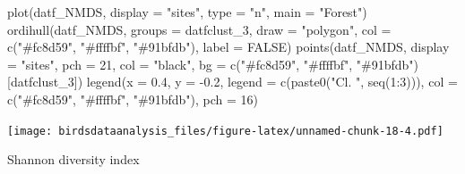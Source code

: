\documentclass[
]{article}
\newenvironment{Shaded}{\begin{snugshade}}{\end{snugshade}}
\newcommand{\AttributeTok}[1]{\textcolor[rgb]{0.77,0.63,0.00}{#1}}
\newcommand{\ConstantTok}[1]{\textcolor[rgb]{0.00,0.00,0.00}{#1}}
\newcommand{\DecValTok}[1]{\textcolor[rgb]{0.00,0.00,0.81}{#1}}
\newcommand{\FloatTok}[1]{\textcolor[rgb]{0.00,0.00,0.81}{#1}}
\newcommand{\FunctionTok}[1]{\textcolor[rgb]{0.00,0.00,0.00}{#1}}
\newcommand{\NormalTok}[1]{#1}
\newcommand{\SpecialCharTok}[1]{\textcolor[rgb]{0.00,0.00,0.00}{#1}}
\newcommand{\StringTok}[1]{\textcolor[rgb]{0.31,0.60,0.02}{#1}}
\begin{document}
\begin{Shaded}
\begin{Highlighting}[]
\FunctionTok{plot}\NormalTok{(datf\_NMDS, }\AttributeTok{display =} \StringTok{"sites"}\NormalTok{, }\AttributeTok{type =} \StringTok{"n"}\NormalTok{, }\AttributeTok{main =} \StringTok{"Forest"}\NormalTok{)}
\FunctionTok{ordihull}\NormalTok{(datf\_NMDS, }\AttributeTok{groups =}\NormalTok{ datfclust\_3,}
         \AttributeTok{draw =} \StringTok{"polygon"}\NormalTok{, }\AttributeTok{col =} \FunctionTok{c}\NormalTok{(}\StringTok{"\#fc8d59"}\NormalTok{, }\StringTok{"\#ffffbf"}\NormalTok{, }\StringTok{"\#91bfdb"}\NormalTok{),}
         \AttributeTok{label =} \ConstantTok{FALSE}\NormalTok{)}
\FunctionTok{points}\NormalTok{(datf\_NMDS, }\AttributeTok{display =} \StringTok{"sites"}\NormalTok{, }\AttributeTok{pch =} \DecValTok{21}\NormalTok{, }\AttributeTok{col =} \StringTok{"black"}\NormalTok{,}
       \AttributeTok{bg =} \FunctionTok{c}\NormalTok{(}\StringTok{"\#fc8d59"}\NormalTok{, }\StringTok{"\#ffffbf"}\NormalTok{, }\StringTok{"\#91bfdb"}\NormalTok{)[datfclust\_3])}
\FunctionTok{legend}\NormalTok{(}\AttributeTok{x =} \FloatTok{0.4}\NormalTok{, }\AttributeTok{y =} \SpecialCharTok{{-}}\FloatTok{0.2}\NormalTok{, }\AttributeTok{legend =} \FunctionTok{c}\NormalTok{(}\FunctionTok{paste0}\NormalTok{(}\StringTok{"Cl. "}\NormalTok{, }\FunctionTok{seq}\NormalTok{(}\DecValTok{1}\SpecialCharTok{:}\DecValTok{3}\NormalTok{))),}
       \AttributeTok{col =} \FunctionTok{c}\NormalTok{(}\StringTok{"\#fc8d59"}\NormalTok{, }\StringTok{"\#ffffbf"}\NormalTok{, }\StringTok{"\#91bfdb"}\NormalTok{), }\AttributeTok{pch =} \DecValTok{16}\NormalTok{)}
\end{Highlighting}
\end{Shaded}

\texttt{[image: birdsdataanalysis\_files/figure-latex/unnamed-chunk-18-4.pdf]}

Shannon diversity index
\end{document}

